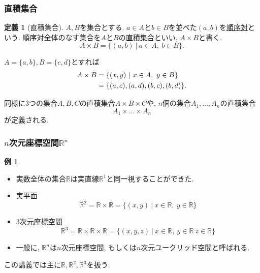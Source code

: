 \documentclass[dvipdfmx,cjk,10.2pt]{beamer}
\newcommand{\R}{\mathbb{R}}
\theoremstyle{definition}
\newtheorem{Ex}[Thm]{例}
\newtheorem{Def}[Thm]{定義}
\begin{document}
\begin{frame}
\frametitle{直積集合}   

\begin{Def}[直積集合]
$A, B$を集合とする. 
$a \in A$と$b \in B$を並べた$(a,b)$を\underline{順序対}という. 
順序対全体のなす集合を$A$と$B$の\underline{直積集合}といい, $A \times B$と書く. 
$$
A \times B = \{(a,b) \ | \ a \in A, \ b \in B\}. 
$$
\end{Def}

$A=\{a,b\}, B=\{c,d\}$とすれば
\begin{align}
A\times B &= \{(x,y) \ | \ x \in A, \ y \in B \} \notag \\
&=\{(a,c), (a,d), (b,c), (b,d)\}.  \notag
\end{align}

同様に3つの集合$A,B,C$の直積集合$A \times B \times C$や, $n$個の集合$A_1,\dots,A_n$の直積集合
$$
A_1 \times \dots \times A_n
$$
が定義される. 



\end{frame}






\begin{frame}
\frametitle{$n$次元座標空間$\R^n$}   


\begin{Ex}
\begin{itemize}
\item 実数全体の集合$\R$は実直線$\R^1$と同一視することができた. 
\item 実平面
$$
\R^2=\R \times \R=\{(x,y) \ | \ x \in \R, \ y \in \R\}
$$
\item $3$次元座標空間
$$
\R^3=\R \times \R \times \R=\{(x,y,z) \ | \ x \in \R, \ y \in \R \ z\in \R\}
$$
\item 一般に, $\R^n$は$n$次元座標空間, もしくは$n$次元ユークリッド空間と呼ばれる. 
\end{itemize}
\end{Ex}

この講義では主に$\R, \R^2,\R^3$を扱う. 

\end{frame}

\end{document}
